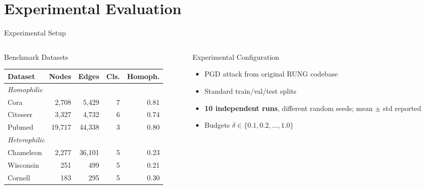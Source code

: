 \documentclass[aspectratio=169]{beamer}
\begin{document}
\section{Experimental Evaluation}

\begin{frame}{Experimental Setup}
  \tiny
  \begin{columns}[T]
    \begin{column}{0.50\textwidth}
      \begin{block}{Benchmark Datasets}
        \vspace{4pt}
        \footnotesize
        \begin{tabular}{lrrrr}
          \toprule
          \textbf{Dataset} & \textbf{Nodes} & \textbf{Edges} & \textbf{Cls.} & \textbf{Homoph.} \\
          \midrule
          \multicolumn{5}{l}{\textit{Homophilic}} \\
          Cora      & 2,708  & 5,429  & 7 & 0.81 \\
          Citeseer  & 3,327  & 4,732  & 6 & 0.74 \\
          Pubmed    & 19,717 & 44,338 & 3 & 0.80 \\
          \midrule
          \multicolumn{5}{l}{\textit{Heterophilic}} \\
          Chameleon & 2,277  & 36,101 & 5 & 0.23 \\
          Wisconsin & 251    & 499    & 5 & 0.21 \\
          Cornell   & 183    & 295    & 5 & 0.30 \\
          \bottomrule
        \end{tabular}
      \end{block}
    \end{column}
    \begin{column}{0.47\textwidth}
      \begin{block}{Experimental Configuration}
        \begin{itemize}
          \item PGD attack from original RUNG codebase
          \item Standard train/val/test splits
          \item \textbf{10 independent runs}, different random seeds; mean $\pm$ std reported
          \item Budgets $\delta \in \{0.1, 0.2, \ldots, 1.0\}$
        \end{itemize}

\end{block}
\end{column}
\end{columns}
\end{frame}
\end{document}
